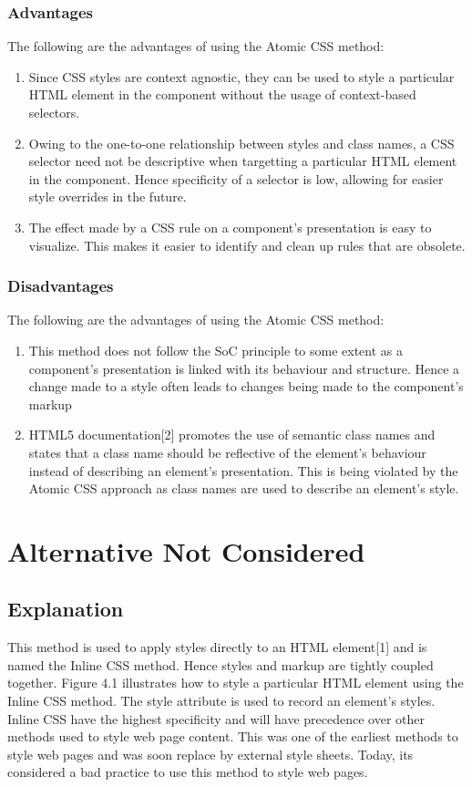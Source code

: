 \documentclass[12pt]{article}
\begin{document}
\subsubsection{Advantages}
The following are the advantages of using the Atomic CSS method:
\begin{enumerate}
	\item Since CSS styles are context agnostic, they can be used to style a particular HTML element in the component without the usage of context-based selectors.

	\item Owing to the one-to-one relationship between styles and class names, a CSS selector need not be descriptive when targetting a particular HTML element in the component. Hence specificity of a selector is low, allowing for easier style overrides in the future.

	\item The effect made by a CSS rule on a component's presentation is easy to visualize. This makes it easier to identify and clean up rules that are obsolete.
\end{enumerate}


\subsubsection{Disadvantages}
The following are the advantages of using the Atomic CSS method:
\begin{enumerate}
	\item This method does not follow the SoC principle to some extent as a component's presentation is linked with its behaviour and structure. Hence a change made to a style often leads to changes being made to the component's markup

	\item HTML5 documentation[2] promotes the use of semantic class names and states that a class name should be reflective of the element's behaviour instead of describing an element's presentation. This is being violated by the Atomic CSS approach as class names are used to describe an element's style.
\end{enumerate}

\newpage

\section{Alternative Not Considered}
\subsection{Explanation}
This method is used to apply styles directly to an HTML element[1] and is named the Inline CSS method. Hence styles and markup are tightly coupled together. Figure 4.1 illustrates how to style a particular HTML element using the Inline CSS method. The style attribute is used to record an element's styles. Inline CSS have the highest specificity and will have precedence over other methods used to style web page content. This was one of the earliest methods to style web pages and was soon replace by external style sheets. Today, its considered a bad practice to use this method to style web pages.
\end{document}
